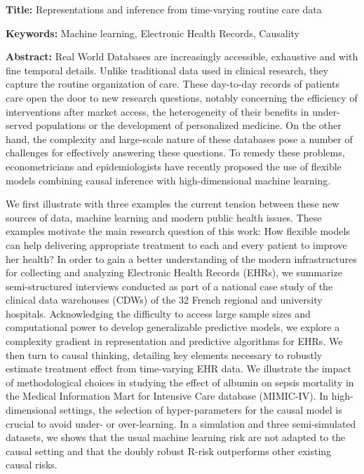 \documentclass[french,12pt,twoside,a4paper]{book}
\begin{document}
\clearpage
\begin{mdframed}[linecolor=Prune,linewidth=1]

  \textbf{Title:} Representations and inference from time-varying routine care data

  \noindent \textbf{Keywords:} Machine learning, Electronic Health Records, Causality

  \begin{multicols}{2}
    \noindent \textbf{Abstract:} Real World Databases are increasingly
    accessible, exhaustive and with fine temporal details. Unlike traditional
    data used in clinical research, they capture the routine organization of
    care. These day-to-day records of patients care open the door to new
    research questions, notably concerning the efficiency of interventions after
    market access, the heterogeneity of their benefits in under-served
    populations or the development of personalized medicine. On the other hand,
    the complexity and large-scale nature of these databases pose a number of
    challenges for effectively answering these questions. To remedy these
    problems, econometricians and epidemiologists have recently proposed the use
    of flexible models combining causal inference with high-dimensional machine
    learning.

    We first illustrate with three examples the current tension between these
    new sources of data, machine learning and modern public health issues. These
    examples motivate the main research question of this work: How flexible
    models can help delivering appropriate treatment to each and every patient
    to improve her health? In order to gain a better understanding of the
    modern infrastructures for collecting and analyzing Electronic Health
    Records (EHRs), we summarize semi-structured interviews conducted as part of
    a national case study of the clinical data warehouses (CDWs) of the 32
    French regional and university hospitals. Acknowledging the difficulty to
    access large sample sizes and computational power to develop generalizable
    predictive models, we explore a complexity gradient in representation and
    predictive algorithms for EHRs. We then turn to causal thinking, detailing
    key elements necessary to robustly estimate treatment effect from
    time-varying EHR data. We illustrate the impact of methodological choices in
    studying the effect of albumin on sepsis mortality in the Medical
    Information Mart for Intensive Care database (MIMIC-IV). In high-dimensional
    settings, the selection of hyper-parameters for the causal model is crucial
    to avoid under- or over-learning. In a simulation and three semi-simulated
    datasets, we shows that the usual machine learning risk are not adapted to
    the causal setting and that the doubly robust R-risk outperforms other
    existing causal risks.
  \end{multicols}
\end{mdframed}
\end{document}
